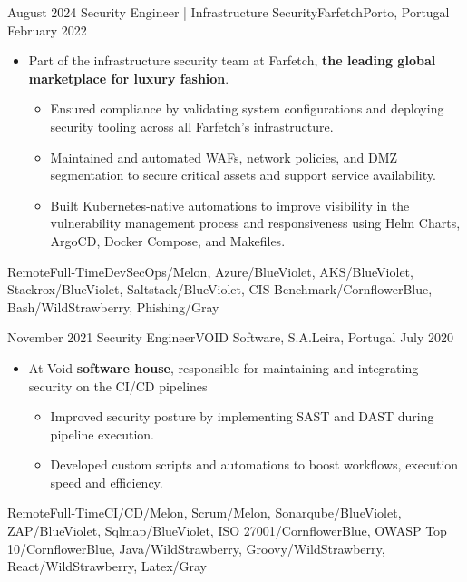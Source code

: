 \begin{experiences}
  \experience
  {August 2024} {Security Engineer | Infrastructure Security}{Farfetch}{Porto, Portugal}
  {February 2022}{
  \begin{itemize}
    \item Part of the infrastructure security team at Farfetch, \textbf{the leading global marketplace for luxury fashion}.
       \begin{itemize}
        \item Ensured compliance by validating system configurations and deploying security tooling across all Farfetch’s infrastructure.
        \item Maintained and automated WAFs, network policies, and DMZ segmentation to secure critical assets and support service availability.
        \item Built Kubernetes-native automations to improve visibility in the vulnerability management process and responsiveness using Helm Charts, ArgoCD, Docker Compose, and Makefiles.
    \end{itemize}
  \end{itemize}}
  {Remote}{Full-Time}{DevSecOps/Melon, Azure/BlueViolet, AKS/BlueViolet, Stackrox/BlueViolet, Saltstack/BlueViolet, CIS Benchmark/CornflowerBlue, Bash/WildStrawberry, Phishing/Gray}

  \emptySeparator

  \experience
  {November 2021} {Security Engineer}{VOID Software, S.A.}{Leira, Portugal}
  {July 2020}{
  \begin{itemize}
    \item At Void \textbf{software house}, responsible for maintaining and integrating security on the CI/CD pipelines
    \begin{itemize}
        \item Improved security posture by implementing SAST and DAST during pipeline execution.
        \item Developed custom scripts and automations to boost workflows, execution speed and efficiency.
     \end{itemize}
  \end{itemize}}
  {Remote}{Full-Time}{{CI/CD}/Melon, Scrum/Melon, Sonarqube/BlueViolet, ZAP/BlueViolet, Sqlmap/BlueViolet, ISO 27001/CornflowerBlue, OWASP Top 10/CornflowerBlue, Java/WildStrawberry, Groovy/WildStrawberry, React/WildStrawberry, Latex/Gray}

  \emptySeparator

\end{experiences}